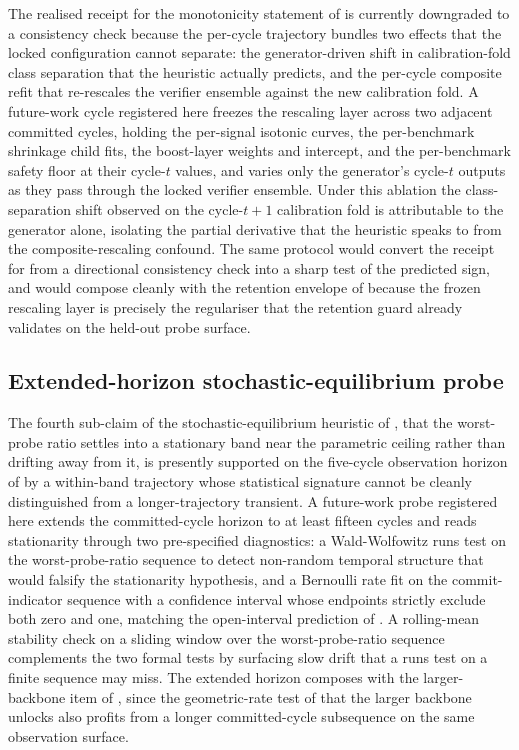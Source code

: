 The realised receipt for the monotonicity statement of  is currently downgraded to a consistency check because the per-cycle trajectory bundles two effects that the locked configuration cannot separate: the generator-driven shift in calibration-fold class separation that the heuristic actually predicts, and the per-cycle composite refit that re-rescales the verifier ensemble against the new calibration fold. A future-work cycle registered here freezes the rescaling layer across two adjacent committed cycles, holding the per-signal isotonic curves, the per-benchmark shrinkage child fits, the boost-layer weights and intercept, and the per-benchmark safety floor at their cycle-$t$ values, and varies only the generator's cycle-$t$ outputs as they pass through the locked verifier ensemble. Under this ablation the class-separation shift observed on the cycle-$t{+}1$ calibration fold is attributable to the generator alone, isolating the partial derivative that the heuristic speaks to from the composite-rescaling confound. The same protocol would convert the receipt for  from a directional consistency check into a sharp test of the predicted sign, and would compose cleanly with the retention envelope of  because the frozen rescaling layer is precisely the regulariser that the retention guard already validates on the held-out probe surface.

\subsection{Extended-horizon stochastic-equilibrium probe}
\label{sec:future-equilibrium-horizon}

The fourth sub-claim of the stochastic-equilibrium heuristic of , that the worst-probe ratio settles into a stationary band near the parametric ceiling rather than drifting away from it, is presently supported on the five-cycle observation horizon of  by a within-band trajectory whose statistical signature cannot be cleanly distinguished from a longer-trajectory transient. A future-work probe registered here extends the committed-cycle horizon to at least fifteen cycles and reads stationarity through two pre-specified diagnostics: a Wald-Wolfowitz runs test on the worst-probe-ratio sequence to detect non-random temporal structure that would falsify the stationarity hypothesis, and a Bernoulli rate fit on the commit-indicator sequence with a confidence interval whose endpoints strictly exclude both zero and one, matching the open-interval prediction of . A rolling-mean stability check on a sliding window over the worst-probe-ratio sequence complements the two formal tests by surfacing slow drift that a runs test on a finite sequence may miss. The extended horizon composes with the larger-backbone item of , since the geometric-rate test of  that the larger backbone unlocks also profits from a longer committed-cycle subsequence on the same observation surface.

